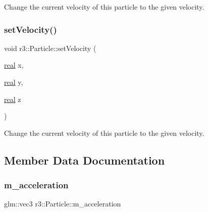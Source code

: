 Change the current velocity of this particle to the given velocity. \mbox{\label{classr3_1_1_particle_afe7217976e22ed36892d8f7df4ea68d2}} 
\subsubsection{\texorpdfstring{set\+Velocity()}{setVelocity()}\hspace{0.1cm}{\footnotesize\ttfamily [2/2]}}
{\footnotesize\ttfamily void r3\+::\+Particle\+::set\+Velocity (\begin{DoxyParamCaption}\item[{\mbox{\hyperlink{namespacer3_ab2016b3e3f743fb735afce242f0dc1eb}{real}}}]{x,  }\item[{\mbox{\hyperlink{namespacer3_ab2016b3e3f743fb735afce242f0dc1eb}{real}}}]{y,  }\item[{\mbox{\hyperlink{namespacer3_ab2016b3e3f743fb735afce242f0dc1eb}{real}}}]{z }\end{DoxyParamCaption})}

Change the current velocity of this particle to the given velocity. 

\subsection{Member Data Documentation}
\mbox{\label{classr3_1_1_particle_aa6c9d639f87a9291c60165c057e05a4f}} 
\subsubsection{\texorpdfstring{m\+\_\+acceleration}{m\_acceleration}}
{\footnotesize\ttfamily glm\+::vec3 r3\+::\+Particle\+::m\+\_\+acceleration\hspace{0.3cm}{\ttfamily [protected]}}

\mbox{\label{classr3_1_1_particle_a68034523bad4d9e4023f69b849197eb3}} 
